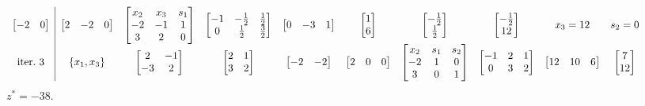 \begin{equation*}
{\begin{array}{ c|c c c c c c c c c c c c c }
\begin{bmatrix}
-2 & 0
\end{bmatrix} & \begin{bmatrix}
2 & -2 & 0
\end{bmatrix} & \begin{bmatrix}
x_{2} & x_{3} & s_{1}\\
-2 & -1 & 1\\
3 & 2 & 0
\end{bmatrix} & \begin{bmatrix}
-1 & -\frac{1}{2} & \frac{1}{2}\\
0 & \frac{1}{2} & \frac{3}{2}
\end{bmatrix} & \begin{bmatrix}
0 & -3 & 1
\end{bmatrix} & \begin{bmatrix}
1\\
6
\end{bmatrix} & \begin{bmatrix}
-\frac{1}{2}\\
\frac{1}{2}
\end{bmatrix} & \begin{bmatrix}
-\frac{1}{2}\\
12
\end{bmatrix} & x_{3} =12 & s_{2} =0\\
\text{iter.} \ 3 & \{x_{1} ,x_{3}\} & \begin{bmatrix}
2 & -1\\
-3 & 2
\end{bmatrix} & \begin{bmatrix}
2 & 1\\
3 & 2
\end{bmatrix} & \begin{bmatrix}
-2 & -2
\end{bmatrix} & \begin{bmatrix}
2 & 0 & 0
\end{bmatrix} & \begin{bmatrix}
x_{2} & s_{1} & s_{2}\\
-2 & 1 & 0\\
3 & 0 & 1
\end{bmatrix} & \begin{bmatrix}
-1 & 2 & 1\\
0 & 3 & 2
\end{bmatrix} & \begin{bmatrix}
12 & 10 & 6
\end{bmatrix} & \begin{bmatrix}
7\\
12
\end{bmatrix} &  &  &  & 
\end{array}
}
\end{equation*}
$z^{*} =-38$.

